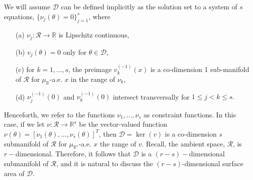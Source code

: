 \documentclass[12 point]{article}
\begin{document}
We will assume $\mathcal{D}$ can be defined implicitly as the solution set to a system of $s$ equations,  $\{\nu_j(\theta)=0\}_{j=1}^s$, where 
\begin{itemize}
\item[(a)] $\nu_j:\mathcal{R}\to\mathbb{R}$ is Lipschitz continuous,
\item[(b)] $v_j(\theta)=0$ only for $\theta\in\mathcal{D}$,
\item[(c)] for $k=1,\dots, s$, the preimage $v_k^{(-1)}(x)$ is a co-dimension 1 sub-manifold of $\mathcal{R}$ for $\mu_\mathbb{R}$-a.e. $x$ in the range of $\nu_k$,
\item[(d)] $\nu_j^{(-1)}(0)$ and $\nu_k^{(-1)}(0)$ intersect transversally for $1\le j<k\le s.$
\end{itemize}
Henceforth, we refer to the functions $\nu_1,\dots,\nu_s$ as constraint functions. In this case, if we let $\nu:\mathcal{R}\to \mathbb{R}^s$ be the vector-valued function $\nu(\theta) = [\nu_1(\theta),\dots,\nu_s(\theta)]^T$, then $\mathcal{D} = \ker(v)$ is a co-dimension $s$ submanifold of $\mathcal{R}$ for $\mu_{\mathbb{R}^s}$-a.e. $x$ the range of $v.$  Recall, the ambient space, $\mathcal{R}$, is $r-$dimensional. Therefore, it follows that $\mathcal{D}$ is a $(r-s)-$dimensional submanifold of $\mathcal{R}$, and it is natural to discuss the $(r-s)$-dimensional surface area of $\mathcal{D}.$
\end{document}
